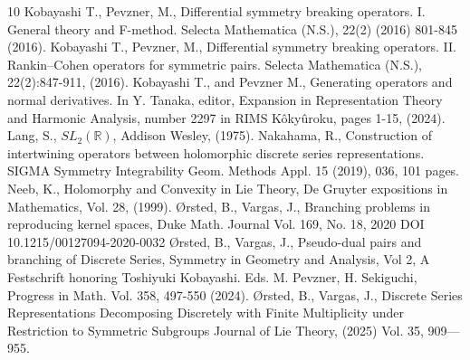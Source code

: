 \documentclass[12pt]{amsart}
\theoremstyle{definition}
\theoremstyle{remark}
\numberwithin{equation}{section}
\begin{document}
\begin{thebibliography}{10}
  	  Kobayashi T.,   Pevzner, M.,  Differential symmetry breaking operators. I. General theory and F-method. Selecta Mathematica (N.S.), 22(2) (2016) 801-845 (2016).
   	  Kobayashi T.,   Pevzner, M.,  Differential symmetry breaking operators. II. Rankin--Cohen operators for symmetric pairs. Selecta     Mathematica (N.S.), 22(2):847-911, (2016).
       Kobayashi T., and   Pevzner M., Generating operators and normal derivatives. In Y. Tanaka, editor, Expansion in Representation Theory and Harmonic Analysis, number 2297 in RIMS Kôkyûroku, pages 1-15, (2024).
   Lang, S., $SL_2(\mathbb R)$, Addison Wesley, (1975).
   Nakahama, R.,  Construction of intertwining operators between holomorphic discrete series representations. SIGMA Symmetry Integrability Geom. Methods Appl. 15 (2019), 036, 101 pages.
     Neeb, K., Holomorphy and Convexity in Lie Theory, De Gruyter expositions in Mathematics, Vol. 28, (1999).
       {\O}rsted, B., Vargas, J., Branching problems in reproducing  kernel spaces, Duke Math. Journal
Vol. 169, No. 18,  2020 DOI 10.1215/00127094-2020-0032
    {\O}rsted, B., Vargas, J., Pseudo-dual pairs and branching of Discrete Series,   Symmetry in Geometry and Analysis, Vol 2,  A Festschrift honoring Toshiyuki Kobayashi. Eds. M. Pevzner, H. Sekiguchi,  Progress in Math. Vol. 358,   497-550
       (2024).
 {\O}rsted, B.,    Vargas, J.,
Discrete Series Representations Decomposing Discretely with Finite Multiplicity under Restriction to Symmetric Subgroups Journal of Lie Theory, (2025) Vol. 35,   909—955.


\end{thebibliography}
\end{document}
